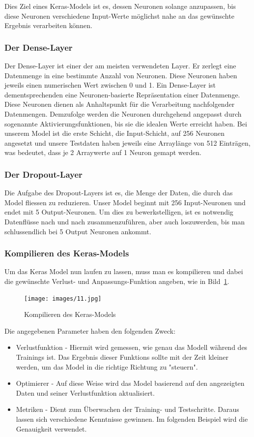 Dies Ziel eines Keras-Models ist es, dessen Neuronen solange anzupassen, bis diese Neuronen verschiedene Input-Werte möglichst nahe an das gewünschte Ergebnis verarbeiten können.

\subsubsection{Der Dense-Layer}
Der Dense-Layer ist einer der am meisten verwendeten Layer. Er zerlegt eine Datenmenge in eine bestimmte Anzahl von Neuronen. Diese Neuronen haben jeweils einen numerischen Wert zwischen 0 und 1. Ein Dense-Layer ist dementsprechenden eine Neuronen-basierte Repräsentation einer Datenmenge. Diese Neuronen dienen als Anhaltspunkt für die Verarbeitung nachfolgender Datenmengen. Demzufolge werden die Neuronen durchgehend angepasst durch sogenannte Aktivierungsfunktionen, bis sie die idealen Werte erreicht haben. Bei unserem Model ist die erste Schicht, die Input-Schicht, auf 256 Neuronen angesetzt und unsere Testdaten haben jeweils eine Arraylänge von 512 Einträgen, was bedeutet, dass je 2 Arraywerte auf 1 Neuron gemapt werden.

\subsubsection{Der Dropout-Layer}
Die Aufgabe des Dropout-Layers ist es, die Menge der Daten, die durch das Model fliessen zu reduzieren. Unser Model beginnt mit 256 Input-Neuronen und endet mit 5 Output-Neuronen. Um dies zu bewerkstelligen, ist es notwendig Datenflüsse nach und nach zusammenzuführen, aber auch loszuwerden, bis man schlussendlich bei 5 Output Neuronen ankommt.

\subsubsection{Kompilieren des Keras-Models}
Um das Keras Model nun laufen zu lassen, muss man es kompilieren und dabei die gewünschte Verlust- und Anpassungs-Funktion angeben, wie in Bild~\ref{fig:fig_09}.
\begin{figure}[ht!]
\centering
\texttt{[image: images/11.jpg]}
\caption{Kompilieren des Keras-Models}
\label{fig:fig_09}
\end{figure}
\FloatBarrier

Die angegebenen Parameter haben den folgenden Zweck:

\begin{itemize}
    \item Verlustfunktion - Hiermit wird gemessen, wie genau das Modell während des Trainings ist. Das Ergebnis dieser Funktions sollte mit der Zeit kleiner werden, um das Model in die richtige Richtung zu "steuern".
    \item Optimierer - Auf diese Weise wird das Model basierend auf den angezeigten Daten und seiner Verlustfunktion aktualisiert.
    \item Metriken - Dient zum Überwachen der Training- und Testschritte. Daraus lassen sich verschiedene Kenntnisse gewinnen. Im folgenden Beispiel wird die Genauigkeit verwendet.
\end{itemize}


